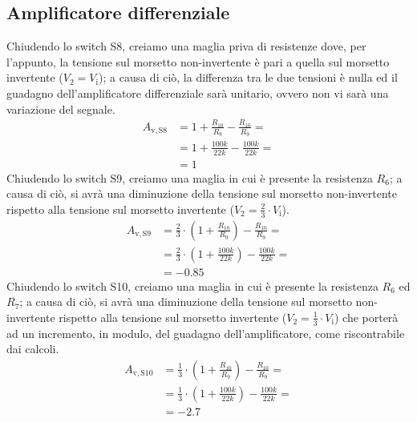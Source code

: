 \documentclass[a4paper]{article}
\begin{document}
		\subsection{Amplificatore differenziale}
			Chiudendo lo switch S8, creiamo una maglia priva di resistenze dove, per l'appunto, la tensione sul morsetto non-invertente è pari a quella sul morsetto invertente ($ V_{2} = V_{\mathrm{i}} $); a causa di ciò, la differenza tra le due tensioni è nulla ed il guadagno dell'amplificatore differenziale sarà unitario, ovvero non vi sarà una variazione del segnale.
			\begin{equation*}
				\begin{split}
					A_{\mathrm{v, S8}} &= 1 + \frac{R_{10}}{R_{9}} - \frac{R_{10}}{R_{9}} = \\
									   &= 1 + \frac{100k}{22k} - \frac{100k}{22k} = \\
									   &= 1
				\end{split}
			\end{equation*}
			Chiudendo lo switch S9, creiamo una maglia in cui è presente la resistenza $ R_{6} $; a causa di ciò, si avrà una diminuzione della tensione sul morsetto non-invertente rispetto alla tensione sul morsetto invertente ($ V_{2} = \frac{2}{3} \cdot V_{\mathrm{i}} $).
			\begin{equation*}
				\begin{split}
					A_{\mathrm{v, S9}} &= \frac{2}{3} \cdot (1 + \frac{R_{10}}{R_{9}}) - \frac{R_{10}}{R_{9}} = \\
									   &= \frac{2}{3} \cdot (1 + \frac{100k}{22k}) - \frac{100k}{22k} = \\
									   &= -0.85
				\end{split}
			\end{equation*}
			Chiudendo lo switch S10, creiamo una maglia in cui è presente la resistenza $ R_{6} $ ed $ R_{7} $; a causa di ciò, si avrà una diminuzione della tensione sul morsetto non-invertente rispetto alla tensione sul morsetto invertente ($ V_{2} = \frac{1}{3} \cdot V_{\mathrm{i}} $) che porterà ad un incremento, in modulo, del guadagno dell'amplificatore, come riscontrabile dai calcoli.
			\begin{equation*}
				\begin{split}
					A_{\mathrm{v, S10}} &= \frac{1}{3} \cdot (1 + \frac{R_{10}}{R_{9}}) - \frac{R_{10}}{R_{9}} = \\
										&= \frac{1}{3} \cdot (1 + \frac{100k}{22k}) - \frac{100k}{22k} = \\
										&= -2.7
				\end{split}
			\end{equation*}
\end{document}

